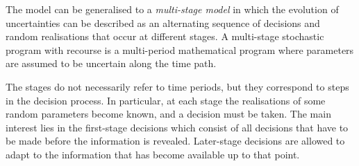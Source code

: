 
The model can be generalised to a {\em multi-stage model} in which 
the evolution of uncertainties can be 
described as an alternating sequence of decisions and random 
realisations that occur at different stages.
A multi-stage stochastic program with recourse is a multi-period 
mathematical program where parameters are assumed to be uncertain 
along the time path.

The stages do not necessarily refer to time periods, but they correspond
to steps in the decision process. In particular, at each stage the
realisations of some random parameters become known, and a decision
must be taken.
The main interest lies in the 
first-stage decisions which consist of all decisions that have to
be made before the information is revealed. Later-stage decisions 
are allowed to adapt to the information that has become available 
up to that point.

